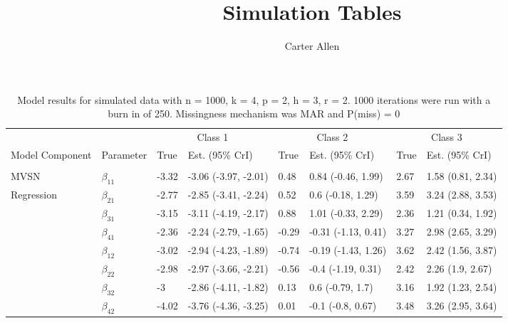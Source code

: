 \documentclass[]{article}
\title{Simulation Tables}
\author{Carter Allen}
\date{}
\begin{document}
\maketitle

\begin{table}[t]

\caption{\label{tab:unnamed-chunk-4}Model results for simulated data with n = 1000, k = 4, p = 2, h = 3, r = 2. 1000 iterations were run with a burn in of 250. Missingness mechanism was MAR and P(miss) = 0}
\centering
\fontsize{8}{10}\selectfont
\begin{tabular}{llllllll}
\toprule
\multicolumn{2}{c}{ } & \multicolumn{2}{c}{Class 1} & \multicolumn{2}{c}{Class 2} & \multicolumn{2}{c}{Class 3} \\
\cmidrule(l{3pt}r{3pt}){3-4} \cmidrule(l{3pt}r{3pt}){5-6} \cmidrule(l{3pt}r{3pt}){7-8}
Model Component & Parameter & True & Est. (95\% CrI) & True & Est. (95\% CrI) & True & Est. (95\% CrI)\\
\midrule
\addlinespace[0.3em]
\multicolumn{8}{l}{\textbf{ }}\\
\hspace{1em}MVSN & $\beta_{11}$ & -3.32 & -3.06 (-3.97, -2.01) & 0.48 & 0.84 (-0.46, 1.99) & 2.67 & 1.58 (0.81, 2.34)\\
\hspace{1em}Regression & $\beta_{21}$ & -2.77 & -2.85 (-3.41, -2.24) & 0.52 & 0.6 (-0.18, 1.29) & 3.59 & 3.24 (2.88, 3.53)\\
\hspace{1em} & $\beta_{31}$ & -3.15 & -3.11 (-4.19, -2.17) & 0.88 & 1.01 (-0.33, 2.29) & 2.36 & 1.21 (0.34, 1.92)\\
\hspace{1em} & $\beta_{41}$ & -2.36 & -2.24 (-2.79, -1.65) & -0.29 & -0.31 (-1.13, 0.41) & 3.27 & 2.98 (2.65, 3.29)\\
\hspace{1em} & $\beta_{12}$ & -3.02 & -2.94 (-4.23, -1.89) & -0.74 & -0.19 (-1.43, 1.26) & 3.62 & 2.42 (1.56, 3.87)\\
\hspace{1em} & $\beta_{22}$ & -2.98 & -2.97 (-3.66, -2.21) & -0.56 & -0.4 (-1.19, 0.31) & 2.42 & 2.26 (1.9, 2.67)\\
\hspace{1em} & $\beta_{32}$ & -3 & -2.86 (-4.11, -1.82) & 0.13 & 0.6 (-0.79, 1.7) & 3.16 & 1.92 (1.23, 2.54)\\
\hspace{1em} & $\beta_{42}$ & -4.02 & -3.76 (-4.36, -3.25) & 0.01 & -0.1 (-0.8, 0.67) & 3.48 & 3.26 (2.95, 3.64)\\

\end{tabular}
\end{table}
\end{document}
